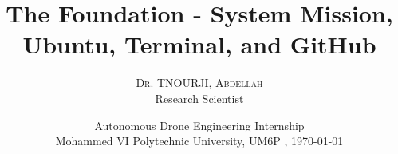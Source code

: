 \title[Short title here]{The Foundation - System Mission, Ubuntu, Terminal, and GitHub}
\author{%
    {\textsc{Dr. TNOURJI, Abdellah}} \\[0.5ex]
    Research Scientist %
}
\date{Autonomous Drone Engineering Internship\\Mohammed VI Polytechnic University, UM6P   , \today} 

